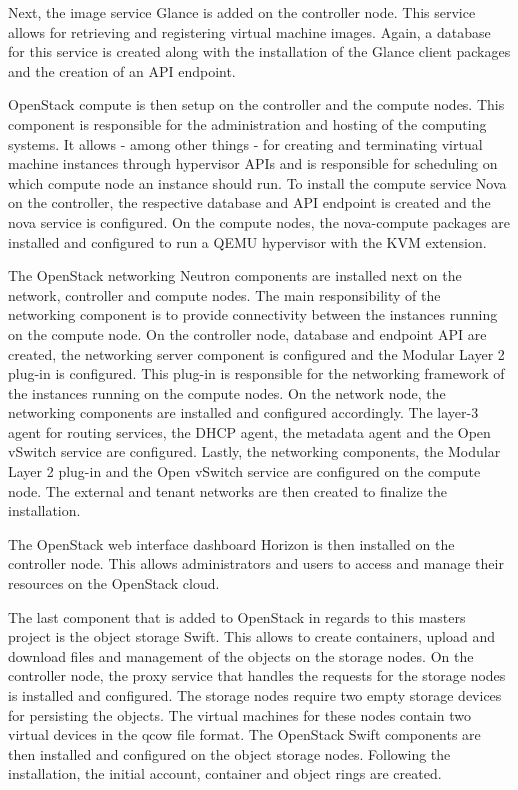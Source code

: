 \documentclass[conference]{IEEEtran}
\begin{document}
Next, the image service Glance is added on the controller node. This service allows for retrieving and registering virtual machine images. Again, a database for this service is created along with the installation of the Glance client packages and the creation of an API endpoint.

OpenStack compute is then setup on the controller and the compute nodes. This component is responsible for the administration and hosting of the computing systems. It allows - among other things - for creating and terminating virtual machine instances through hypervisor APIs and is responsible for scheduling on which compute node an instance should run. To install the compute service Nova on the controller, the respective database and API endpoint is created and the nova service is configured. On the compute nodes, the nova-compute packages are installed and configured to run a QEMU hypervisor with the KVM extension.

The OpenStack networking Neutron components are installed next on the network, controller and compute nodes. The main responsibility of the networking component is to provide connectivity between the instances running on the compute node. On the controller node, database and endpoint API are created, the networking server component is configured and the Modular Layer 2 plug-in is configured. This plug-in is responsible for the networking framework of the instances running on the compute nodes. On the network node, the networking components are installed and configured accordingly. The layer-3 agent for routing services, the DHCP agent, the metadata agent and the Open vSwitch service are configured. Lastly, the networking components, the Modular Layer 2 plug-in and the Open vSwitch service are configured on the compute node. The external and tenant networks are then created to finalize the installation.

The OpenStack web interface dashboard Horizon is then installed on the controller node. This allows administrators and users to access and manage their resources on the OpenStack cloud.

The last component that is added to OpenStack in regards to this masters project is the object storage Swift. This allows to create containers, upload and download files and management of the objects on the storage nodes. On the controller node, the proxy service that handles the requests for the storage nodes is installed and configured. The storage nodes require two empty storage devices for persisting the objects. The virtual machines for these nodes contain two virtual devices in the qcow file format. The OpenStack Swift components are then installed and configured on the object storage nodes. Following the installation, the initial account, container and object rings are created.
\end{document}
